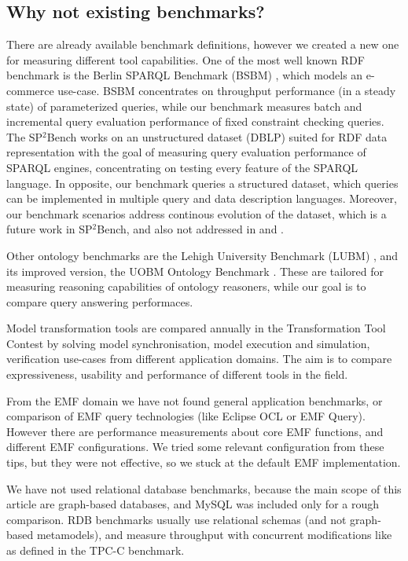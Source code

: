 \subsection{Why not existing benchmarks?}

There are already available benchmark definitions, however we created a new one
for measuring different tool capabilities. One of the most well known RDF
benchmark is the Berlin SPARQL Benchmark (BSBM) \cite{BerlinBenchmark}, which
models an e-commerce use-case. BSBM concentrates on throughput performance (in a
steady state) of parameterized queries, while our benchmark measures batch and
incremental query evaluation performance of fixed constraint checking queries.
The SP$^2$Bench \cite{SP2Bench} works on an unstructured dataset (DBLP) suited
for RDF data representation with the goal of measuring query evaluation
performance of SPARQL engines, concentrating on testing every feature of the
SPARQL language. In opposite, our benchmark queries a structured dataset, which
queries can be implemented in multiple query and data description languages.
Moreover, our benchmark scenarios address continous evolution of the dataset,
which is a future work in SP$^2$Bench, and also not addressed in \cite{SIB} and
\cite{DBpediaSparql}.

Other ontology benchmarks are the Lehigh University Benchmark (LUBM)
\cite{LUBMBenchmark}, and its improved version, the UOBM Ontology Benchmark
\cite{UOBM}. These are tailored for measuring reasoning capabilities of ontology
reasoners, while our goal is to compare query answering performaces.

Model transformation tools are compared annually in the Transformation Tool
Contest \cite{TTC} by solving model synchronisation, model execution and
simulation, verification use-cases from different application domains. The aim
is to compare expressiveness, usability and performance of different
tools in the field. 

From the EMF domain we have not found general application benchmarks, or
comparison of EMF query technologies (like Eclipse OCL or EMF Query). However
there are performance measurements \cite{EMF-performance} about core EMF
functions, and different EMF configurations. We tried some relevant
configuration from these tips, but they were not effective, so we stuck at the
default EMF implementation.

We have not used relational database benchmarks, because the main scope of this
article are graph-based databases, and MySQL was included only for a rough
comparison. RDB benchmarks usually use relational schemas (and not graph-based
metamodels), and measure throughput with concurrent modifications like as
defined in the TPC-C \cite{tpc-c} benchmark.

